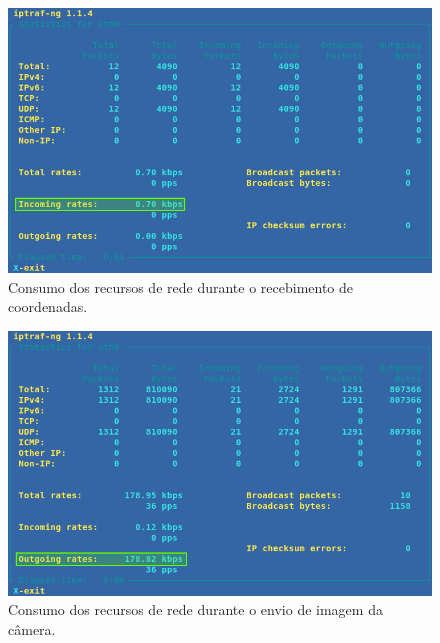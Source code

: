 \begin{figure}[H]
	\centering
	\includegraphics[width=1\textwidth]{figuras/consumo_banda.jpg}
	\caption{Consumo dos recursos de rede durante o recebimento de coordenadas.}
	\label{fig:consumo_banda}
\end{figure}

\begin{figure}[H]
	\centering
	\includegraphics[width=1\textwidth]{figuras/consumo_banda_camera.png}
	\caption{Consumo dos recursos de rede durante o envio de imagem da câmera.}
	\label{fig:consumo_banda}
\end{figure}



